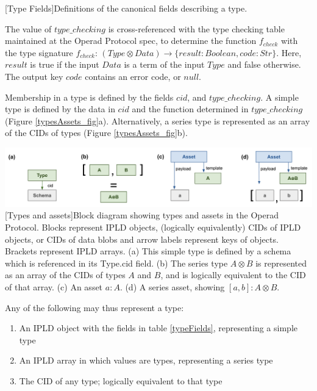 \documentclass[9pt, oneside]{article}   	%
\begin{document}
[Type Fields]{Definitions of the canonical fields describing a type.}
\label{typeFields}
\setlength{\parindent}{.5 cm}
\vspace{.25 cm}

The value of $type\_checking$ is cross-referenced with the type checking table maintained at the Operad Protocol spec, to determine the function $f_{check}$ with the type signature $f_{check}$: $(Type \otimes Data) \rightarrow \{result: Boolean, code: Str\}$. Here, $result$ is true if the input $Data$ is a term of the input $Type$ and false otherwise. The output key $code$ contains an error code, or $null$.

Membership in a type is defined by the fields $cid$, and $type\_checking$. A simple type is defined by the data in $cid$ and the function determined in $type\_checking$ (Figure \ref{typesAssets_fig}a). Alternatively, a series type is represented as an array of the CIDs of types (Figure \ref{typesAssets_fig}b). 


\begin{center}
\includegraphics[width=1\columnwidth]{fig_types_assets_20230802}
[Types and assets]{Block diagram showing types and assets in the Operad Protocol. Blocks represent IPLD objects, (logically equivalently) CIDs of IPLD objects, or CIDs of data blobs and arrow labels represent keys of objects. Brackets represent IPLD arrays. (a) This simple type is defined by a schema which is referenced in its Type.cid field. (b) The series type $A \otimes B$ is represented as an array of the CIDs of types $A$ and $B$, and is logically equivalent to the CID of that array. (c) An asset $a : A$. (d) A series asset, showing $[a, b] : A \otimes B$.}
\label{typesAssets_fig}
\end{center}

Any of the following may thus represent a type:
\begin{enumerate}
\item An IPLD object with the fields in table \ref{typeFields}, representing a simple type
\item An IPLD array in which values are types, representing a series type
\item The CID of any type; logically equivalent to that type
\end{enumerate}
\end{document}
